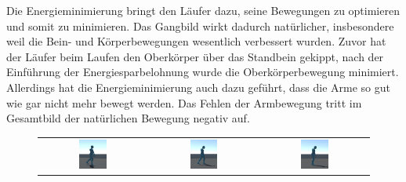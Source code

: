 Die Energieminimierung bringt den Läufer dazu, seine Bewegungen zu optimieren und somit zu minimieren. Das Gangbild wirkt dadurch natürlicher, insbesondere weil die Bein- und Körperbewegungen wesentlich verbessert wurden. Zuvor hat der Läufer beim Laufen den Oberkörper über das Standbein gekippt, nach der Einführung der Energiesparbelohnung wurde die Oberkörperbewegung minimiert. Allerdings hat die Energieminimierung auch dazu geführt, dass die Arme so gut wie gar nicht mehr bewegt werden. Das Fehlen der Armbewegung tritt im Gesamtbild der natürlichen Bewegung negativ auf.

\begin{figure}[H]
  \centering
  \begin{tabular}{ccc}
    \includegraphics[width=0.27\textwidth]{img/charakter_mixamo_laufen_energiespar1} & \includegraphics[width=0.27\textwidth]{img/charakter_mixamo_laufen_energiespar2}  & \includegraphics[width=0.27\textwidth]{img/charakter_mixamo_laufen_energiespar3} \\

\end{tabular}
\end{figure}
